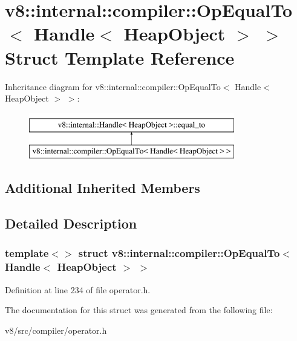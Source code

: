 \hypertarget{structv8_1_1internal_1_1compiler_1_1OpEqualTo_3_01Handle_3_01HeapObject_01_4_01_4}{}\section{v8\+:\+:internal\+:\+:compiler\+:\+:Op\+Equal\+To$<$ Handle$<$ Heap\+Object $>$ $>$ Struct Template Reference}
\label{structv8_1_1internal_1_1compiler_1_1OpEqualTo_3_01Handle_3_01HeapObject_01_4_01_4}
Inheritance diagram for v8\+:\+:internal\+:\+:compiler\+:\+:Op\+Equal\+To$<$ Handle$<$ Heap\+Object $>$ $>$\+:\begin{figure}[H]
\begin{center}
\leavevmode
\includegraphics[height=2.000000cm]{structv8_1_1internal_1_1compiler_1_1OpEqualTo_3_01Handle_3_01HeapObject_01_4_01_4}
\end{center}
\end{figure}
\subsection*{Additional Inherited Members}


\subsection{Detailed Description}
\subsubsection*{template$<$$>$\newline
struct v8\+::internal\+::compiler\+::\+Op\+Equal\+To$<$ Handle$<$ Heap\+Object $>$ $>$}



Definition at line 234 of file operator.\+h.



The documentation for this struct was generated from the following file\+:\begin{DoxyCompactItemize}
\item 
v8/src/compiler/operator.\+h\end{DoxyCompactItemize}
